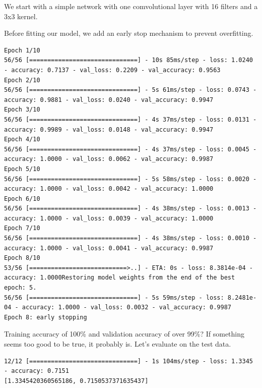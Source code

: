 \documentclass{article}
\begin{document}


We start with a simple network with one comvolutional layer with 16 filters and a 3x3 kernel.



Before fitting our model, we add an early stop mechanism to prevent overfitting.



\begin{lstlisting}[style=output]
Epoch 1/10
56/56 [==============================] - 10s 85ms/step - loss: 1.0240 - accuracy: 0.7137 - val_loss: 0.2209 - val_accuracy: 0.9563
Epoch 2/10
56/56 [==============================] - 5s 61ms/step - loss: 0.0743 - accuracy: 0.9881 - val_loss: 0.0240 - val_accuracy: 0.9947
Epoch 3/10
56/56 [==============================] - 4s 37ms/step - loss: 0.0131 - accuracy: 0.9989 - val_loss: 0.0148 - val_accuracy: 0.9947
Epoch 4/10
56/56 [==============================] - 4s 37ms/step - loss: 0.0045 - accuracy: 1.0000 - val_loss: 0.0062 - val_accuracy: 0.9987
Epoch 5/10
56/56 [==============================] - 5s 58ms/step - loss: 0.0020 - accuracy: 1.0000 - val_loss: 0.0042 - val_accuracy: 1.0000
Epoch 6/10
56/56 [==============================] - 4s 38ms/step - loss: 0.0013 - accuracy: 1.0000 - val_loss: 0.0039 - val_accuracy: 1.0000
Epoch 7/10
56/56 [==============================] - 4s 38ms/step - loss: 0.0010 - accuracy: 1.0000 - val_loss: 0.0041 - val_accuracy: 0.9987
Epoch 8/10
53/56 [===========================>..] - ETA: 0s - loss: 8.3814e-04 - accuracy: 1.0000Restoring model weights from the end of the best epoch: 5.
56/56 [==============================] - 5s 59ms/step - loss: 8.2481e-04 - accuracy: 1.0000 - val_loss: 0.0032 - val_accuracy: 0.9987
Epoch 8: early stopping
\end{lstlisting}

Training accuracy of 100\% and validation accuracy of over 99\%? If something seems too good to be true, it probably is. Let's evaluate on the test data.



\begin{lstlisting}[style=output]
12/12 [==============================] - 1s 104ms/step - loss: 1.3345 - accuracy: 0.7151
[1.3345420360565186, 0.7150537371635437] 
\end{lstlisting}
\end{document}
